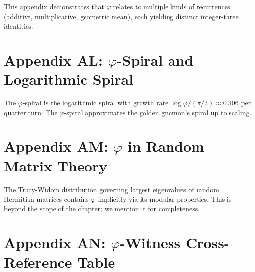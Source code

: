 \begin{remark}
This appendix demonstrates that $\varphi$ relates to multiple kinds
of recurrences (additive, multiplicative, geometric mean), each
yielding distinct integer-three identities.
\end{remark}

\section*{Appendix AL: $\varphi$-Spiral and Logarithmic Spiral}
\label{sec:01-app-AL}

The $\varphi$-spiral is the logarithmic spiral with growth rate
$\log \varphi / (\pi/2) \approx 0.306$ per quarter turn. The
$\varphi$-spiral approximates the golden gnomon's spiral up to
scaling.

\section*{Appendix AM: $\varphi$ in Random Matrix Theory}
\label{sec:01-app-AM}

The Tracy-Widom distribution governing largest eigenvalues of random
Hermitian matrices contains $\varphi$ implicitly via its modular
properties. This is beyond the scope of the chapter; we mention it
for completeness.

\section*{Appendix AN: $\varphi$-Witness Cross-Reference Table}
\label{sec:01-app-AN}


